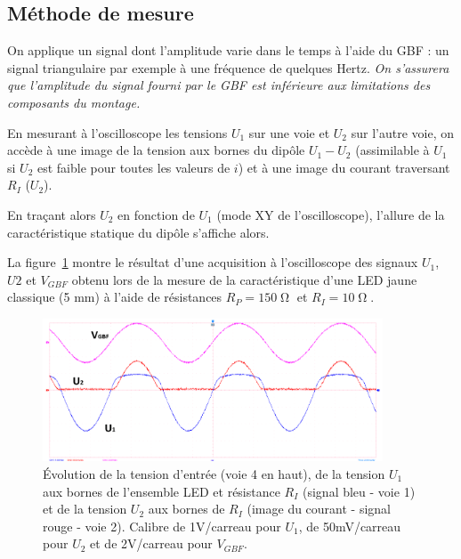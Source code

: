 	
\newpage	
\subsection{Méthode de mesure}

On applique un signal dont l'amplitude varie dans le temps à l'aide du GBF : un signal triangulaire par exemple à une fréquence de quelques Hertz. \textit{On s'assurera que l'amplitude du signal fourni par le GBF est inférieure aux limitations des composants du montage.}

En mesurant à l'oscilloscope les tensions $U_1$ sur une voie et $U_2$ sur l'autre voie, on accède à une image de la tension aux bornes du dipôle  $U_1 - U_2$ (assimilable à $U_1$ si $U_2$ est faible pour toutes les valeurs de $i$) et à une image du courant traversant $R_I$ ($U_2$).

En traçant alors $U_2$ en fonction de $U_1$ (mode XY de l'oscilloscope), l'allure de la caractéristique statique du dipôle s'affiche alors.

\medskip

La figure~\ref{fig:carac_led_auto_res} montre le résultat d'une acquisition à l'oscilloscope des signaux $U_1$, $U2$ et $V_{GBF}$ obtenu lors de la mesure de la caractéristique d'une LED jaune classique (5 mm) à l'aide de résistances $R_P = 150\operatorname{\Omega}$ et $R_I = 10\operatorname{\Omega}$.

\begin{figure}[h!]
    \centering
	\includegraphics[width=0.9\textwidth]{images/carac_phd_time_xy.png}
	
	
    \caption{Évolution de la tension d'entrée (voie 4 en haut), de la tension $U_1$ aux bornes de l'ensemble LED et résistance $R_I$ (signal bleu - voie 1) et de la tension $U_2$ aux bornes de $R_I$ (image du courant - signal rouge - voie 2). Calibre de 1V/carreau pour $U_1$, de 50mV/carreau pour $U_2$ et de 2V/carreau pour $V_{GBF}$.}
    \label{fig:carac_led_auto_res}
\end{figure}




